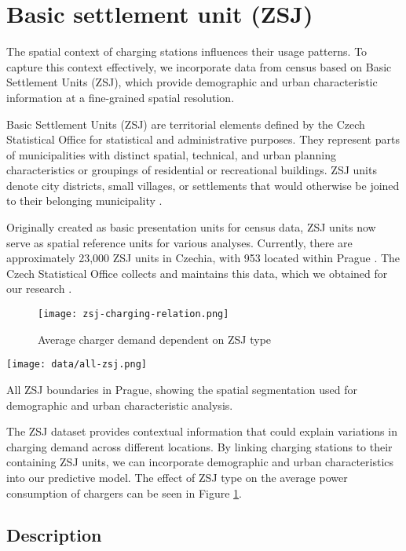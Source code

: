 \section{Basic settlement unit (ZSJ)}

The spatial context of charging stations influences their usage patterns. To capture this context effectively, we incorporate data from census based on Basic Settlement Units (ZSJ), which provide demographic and urban characteristic information at a fine-grained spatial resolution.

Basic Settlement Units (ZSJ) are territorial elements defined by the Czech Statistical Office for statistical and administrative purposes. They represent parts of municipalities with distinct spatial, technical, and urban planning characteristics or groupings of residential or recreational buildings. ZSJ units denote city districts, small villages, or settlements that would otherwise be joined to their belonging municipality .

Originally created as basic presentation units for census data, ZSJ units now serve as spatial reference units for various analyses. Currently, there are approximately 23,000 ZSJ units in Czechia, with 953 located within Prague . The Czech Statistical Office collects and maintains this data, which we obtained for our research .

\begin{figure}
    \texttt{[image: zsj-charging-relation.png]}
    \caption{Average charger demand dependent on ZSJ type}
    \label{fig:zsj-charging-impact}
\end{figure}

\begin{marginfigure}
    \texttt{[image: data/all-zsj.png]}
    \caption{All \acrlong{ZSJ} boundaries in Prague, showing the spatial segmentation used for demographic and urban characteristic analysis.}
\end{marginfigure}


The ZSJ dataset provides contextual information that could explain variations in charging demand across different locations. By linking charging stations to their containing ZSJ units, we can incorporate demographic and urban characteristics into our predictive model. The effect of ZSJ type on the average power consumption of chargers can be seen in Figure \ref{fig:zsj-charging-impact}.

\subsection{Description}

